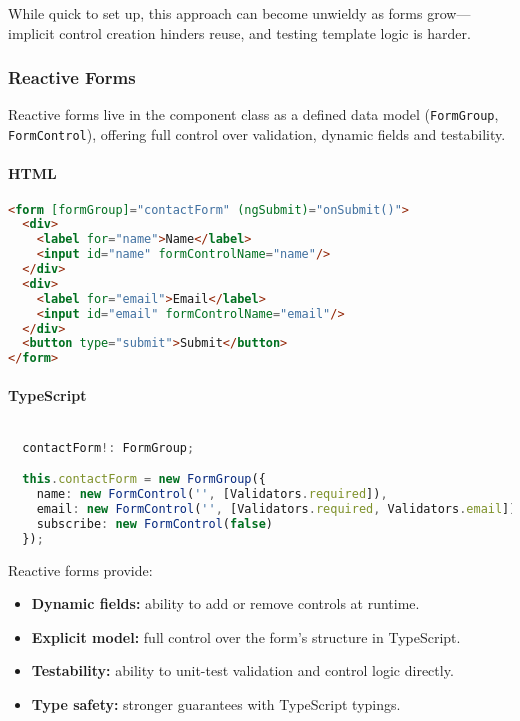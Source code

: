 While quick to set up, this approach can become unwieldy as forms grow—implicit control creation hinders reuse, and
testing template logic is harder.

\subsubsection{Reactive Forms}

Reactive forms live in the component class as a defined data model (\texttt{FormGroup}, \texttt{FormControl}), offering
full control over validation, dynamic fields and testability.

\paragraph{HTML}
\begin{lstlisting}[language=HTML]
<form [formGroup]="contactForm" (ngSubmit)="onSubmit()">
  <div>
    <label for="name">Name</label>
    <input id="name" formControlName="name"/>
  </div>
  <div>
    <label for="email">Email</label>
    <input id="email" formControlName="email"/>
  </div>
  <button type="submit">Submit</button>
</form>
\end{lstlisting}

\paragraph{TypeScript}
\begin{lstlisting}[language=TypeScript]

  contactForm!: FormGroup;

  this.contactForm = new FormGroup({
    name: new FormControl('', [Validators.required]),
    email: new FormControl('', [Validators.required, Validators.email]),
    subscribe: new FormControl(false)
  });
\end{lstlisting}

Reactive forms provide:
\begin{itemize}
  \item \textbf{Dynamic fields:} ability to add or remove controls at runtime.
  \item \textbf{Explicit model:} full control over the form’s structure in TypeScript.
  \item \textbf{Testability:} ability to unit-test validation and control logic directly.
  \item \textbf{Type safety:} stronger guarantees with TypeScript typings.
\end{itemize}

